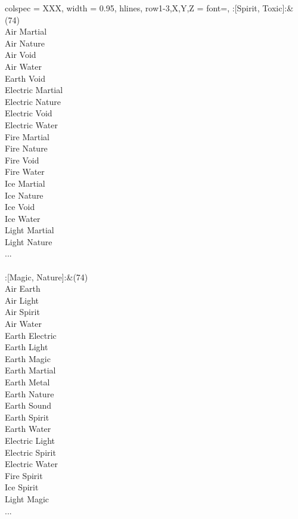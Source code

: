 \begin{longtblr}[
	caption = {2v2 Attacking Effective},
	label = {2v2-Attacking-Effective},
]{
	colspec = {XXX}, width = 0.95\linewidth,
	hlines,
	row{1-3,X,Y,Z} = {font=\bfseries},
}
	:[Spirit, Toxic]:&{(74)\\
	Air Martial \\
	Air Nature \\
	Air Void \\
	Air Water \\
	Earth Void \\
	Electric Martial \\
	Electric Nature \\
	Electric Void \\
	Electric Water \\
	Fire Martial \\
	Fire Nature \\
	Fire Void \\
	Fire Water \\
	Ice Martial \\
	Ice Nature \\
	Ice Void \\
	Ice Water \\
	Light Martial \\
	Light Nature \\
	...\\
	}\\

	:[Magic, Nature]:&{(74)\\
	Air Earth \\
	Air Light \\
	Air Spirit \\
	Air Water \\
	Earth Electric \\
	Earth Light \\
	Earth Magic \\
	Earth Martial \\
	Earth Metal \\
	Earth Nature \\
	Earth Sound \\
	Earth Spirit \\
	Earth Water \\
	Electric Light \\
	Electric Spirit \\
	Electric Water \\
	Fire Spirit \\
	Ice Spirit \\
	Light Magic \\
	...\\
	}\\


\end{longtblr}
